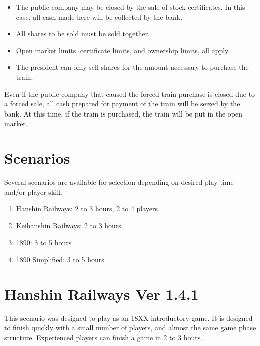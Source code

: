 \documentclass{article}
\begin{document}
\begin{CJK}{UTF8}{min}
\begin{multicols}{2}
\begin{itemize}
\item The public company may be closed by the sale of stock
  certificates. In this case, all cash made here will be collected by
  the bank.

\item All shares to be sold must be sold together.

\item Open market limits, certificate limits, and ownership limits, all apply.

\item The president can only sell shares for the amount necessary to
  purchase the train.
\end{itemize}

Even if the public company that caused the forced train purchase is closed
due to a forced sale, all cash prepared for payment of the train will
be seized by the bank. At this time, if the train is purchased, the
train will be put in the open market.


\newpage

\section*{Scenarios}

Several scenarios are available for selection depending on desired
play time and/or player skill.

\begin{enumerate}[label=\Alph*]
\item Hanshin Railways: 2 to 3 hours, 2 to 4 players
\item Keihanshin Railways: 2 to 3 hours
\item 1890: 3 to 5 hours
\item 1890 Simplified: 3 to 5 hours
\end{enumerate}

\renewcommand*{\thesection}{\Alph{section}}
\renewcommand*{\theHsection}{scenarios.\Alph{section}}
\setcounter{secnumdepth}{3}
\setcounter{section}{0}

\section{Hanshin Railways Ver 1.4.1}

This scenario was designed to play as an 18XX introductory game. It is
designed to finish quickly with a small number of players, and almost
the same game phase structure. Experienced players can finish a game
in 2 to 3 hours.


\end{multicols}
\end{CJK}
\end{document}
